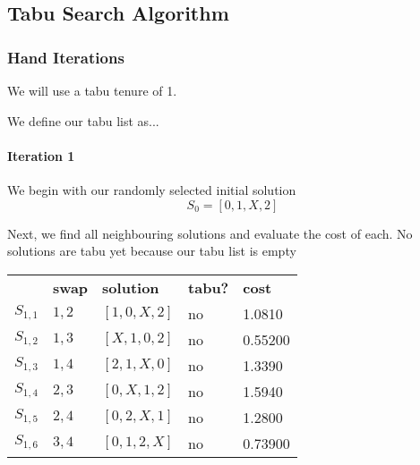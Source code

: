\documentclass[a4paper]{article}
\newcommand{\subsubsubsection}[1]{\paragraph{#1} \mbox{}}
\begin{document}




\subsection{Tabu Search Algorithm} %

\subsubsection{Hand Iterations}

We will use a tabu tenure of 1.

We define our tabu list as...

\subsubsubsection{Iteration 1}

We begin with our randomly selected initial solution
$$S_0 = [ 0, 1, X, 2 ]$$

Next, we find all neighbouring solutions and evaluate the cost of each. No solutions are tabu yet because our tabu list is empty

\begin{tabular}{lllll}
& \textbf{swap}   & \textbf{solution}    & \textbf{tabu?} & \textbf{cost}  \\

$S_{1,1}$ & $1,2$ & $[1, 0, X, 2]$ & no & 1.0810   \\
$S_{1,2}$ & $1,3$ & $[X, 1, 0, 2]$ & no & 0.55200  \\
$S_{1,3}$ & $1,4$ & $[2, 1, X, 0]$ & no & 1.3390   \\
$S_{1,4}$ & $2,3$ & $[0, X, 1, 2]$ & no & 1.5940   \\
$S_{1,5}$ & $2,4$ & $[0, 2, X, 1]$ & no & 1.2800   \\
$S_{1,6}$ & $3,4$ & $[0, 1, 2, X]$ & no & 0.73900  \\
\end{tabular}
\end{document}
